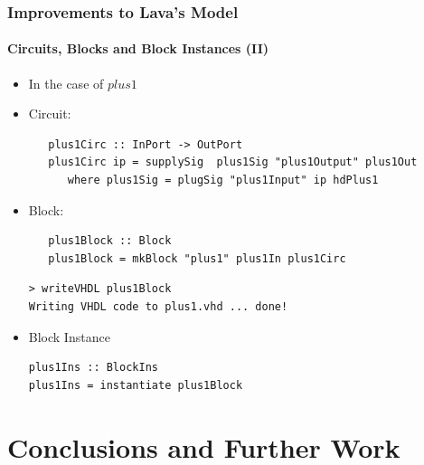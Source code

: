 \documentclass{beamer}
\begin{document}
\begin{frame}[fragile]
  \frametitle{Improvements to Lava's Model}
  \framesubtitle{Circuits, Blocks and Block Instances (II)}
  
\begin{itemize}
\item In the case of $\mathit{plus1}$
\item Circuit:
\begin{lstlisting}
   plus1Circ :: InPort -> OutPort
   plus1Circ ip = supplySig  plus1Sig "plus1Output" plus1Out
      where plus1Sig = plugSig "plus1Input" ip hdPlus1
\end{lstlisting}
\pause
\item Block:
\begin{lstlisting}
   plus1Block :: Block
   plus1Block = mkBlock "plus1" plus1In plus1Circ
\end{lstlisting}
\pause
\begin{verbatim}
> writeVHDL plus1Block
Writing VHDL code to plus1.vhd ... done!
\end{verbatim}
\pause
\item Block Instance
\begin{lstlisting}
plus1Ins :: BlockIns
plus1Ins = instantiate plus1Block
\end{lstlisting}
\end{itemize}

\end{frame}

\section{Conclusions and Further Work}
\end{document}
